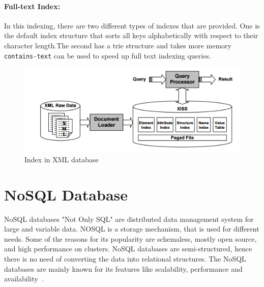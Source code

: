 	  	 \paragraph{Full-text Index:} In this indexing, there are two different types of indexes that are provided. One is the default index structure that sorts all keys alphabetically with respect to their character length.The second has a trie structure and takes more memory \texttt{contains-text} can be used to speed up full text indexing queries.
	  	  	\begin{figure}[h]
    		\includegraphics[width=1\textwidth]{img/Indexing}
    		\caption{Index in XML database~\cite{li2001indexing}}
	\end{figure}

	\section{NoSQL Database}
	NoSQL databases "Not Only SQL" are distributed data management system for large and variable data. NOSQL is a storage mechanism, that is used for different needs. Some of the reasons for its popularity are schemaless, mostly open source, and high performance on clusters. NoSQL databases are semi-structured, hence there is no need of converting the data into relational structures. The NoSQL databases are mainly known for its features like scalability, performance and availability~\citep{hecht2011nosql}.
	
